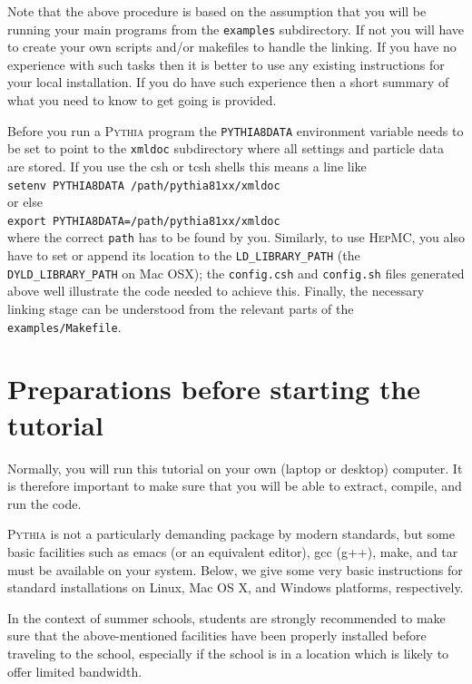 \documentclass[12pt,a4paper]{article}
\begin{document}
Note that the above procedure is based on the assumption that you will
be running your main programs from the \texttt{examples} subdirectory.
If not you will have to create your own scripts and/or makefiles to handle
the linking. If you have no experience with such tasks then it is better
to use any existing instructions for your local installation. If you do
have such experience then a short summary of what you need to know
to get going is provided.

Before you run a \textsc{Pythia} program the \texttt{PYTHIA8DATA} 
environment variable needs to be set to point to the \texttt{xmldoc} 
subdirectory where all settings and particle data are stored. If you 
use the csh or tcsh shells this means a line like\\
\hspace*{10mm}\texttt{setenv PYTHIA8DATA /path/pythia81xx/xmldoc}\\
or else\\   
\hspace*{10mm}\texttt{export PYTHIA8DATA=/path/pythia81xx/xmldoc}\\
where the correct \texttt{path} has to be found by you. 
Similarly, to use \textsc{HepMC}, you also have to set or append its
location to the \texttt{LD\_LIBRARY\_PATH} (the 
\texttt{DYLD\_LIBRARY\_PATH} on Mac OSX); the \texttt{config.csh} 
and \texttt{config.sh} files generated above well illustrate the code
needed to achieve this. Finally, the necessary linking stage can
be understood from the relevant parts of the \texttt{examples/Makefile}. 

\section{Preparations before starting the tutorial}

Normally, you will run this tutorial on your own (laptop or desktop)
computer. It is therefore important to make sure that you will be able 
to extract, compile, and run the code. 

\textsc{Pythia} is not a particularly demanding package by modern 
standards, but some basic facilities such as emacs (or an equivalent 
editor), gcc (g++), make, and tar must be available on your system. 
Below, we give some very basic instructions for standard installations 
on Linux, Mac OS X, and Windows platforms, respectively. 

In the context of summer schools, students are strongly recommended 
to make sure that the above-mentioned facilities have been properly 
installed before traveling to the school, especially if the school 
is in a location which is likely to offer limited bandwidth.
\end{document}
